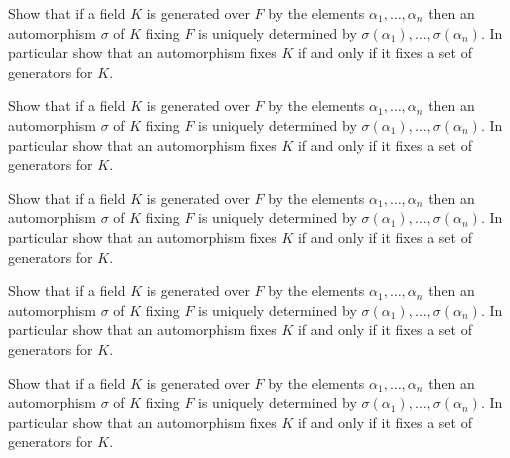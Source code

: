 \documentclass[12pt,letterpaper]{hmcpset}
\begin{document}

\begin{problem}[14.1.1a]
  Show that if a field $K$ is generated over $F$ by the elements $\alpha_1, \dots , \alpha_n$ then an automorphism $\sigma$ of $K$ fixing $F$ is uniquely determined by $\sigma(\alpha_1), \dots, \sigma(\alpha_n)$. In particular show that an automorphism fixes $K$ if and only if it fixes a set of generators for $K$.
\end{problem}
\begin{solution}
\vfill
\end{solution}
\newpage

\begin{problem}[14.1.3]
  Show that if a field $K$ is generated over $F$ by the elements $\alpha_1, \dots , \alpha_n$ then an automorphism $\sigma$ of $K$ fixing $F$ is uniquely determined by $\sigma(\alpha_1), \dots, \sigma(\alpha_n)$. In particular show that an automorphism fixes $K$ if and only if it fixes a set of generators for $K$.
\end{problem}
\begin{solution}
\vfill
\end{solution}
\newpage

\begin{problem}[14.1.7]
  Show that if a field $K$ is generated over $F$ by the elements $\alpha_1, \dots , \alpha_n$ then an automorphism $\sigma$ of $K$ fixing $F$ is uniquely determined by $\sigma(\alpha_1), \dots, \sigma(\alpha_n)$. In particular show that an automorphism fixes $K$ if and only if it fixes a set of generators for $K$.
\end{problem}
\begin{solution}
\vfill
\end{solution}
\newpage

\begin{problem}[14.2.3]
  Show that if a field $K$ is generated over $F$ by the elements $\alpha_1, \dots , \alpha_n$ then an automorphism $\sigma$ of $K$ fixing $F$ is uniquely determined by $\sigma(\alpha_1), \dots, \sigma(\alpha_n)$. In particular show that an automorphism fixes $K$ if and only if it fixes a set of generators for $K$.
\end{problem}
\begin{solution}
\vfill
\end{solution}
\newpage

\begin{problem}[14.2.13]
  Show that if a field $K$ is generated over $F$ by the elements $\alpha_1, \dots , \alpha_n$ then an automorphism $\sigma$ of $K$ fixing $F$ is uniquely determined by $\sigma(\alpha_1), \dots, \sigma(\alpha_n)$. In particular show that an automorphism fixes $K$ if and only if it fixes a set of generators for $K$.
\end{problem}
\begin{solution}
\vfill
\end{solution}
\newpage
\end{document}
